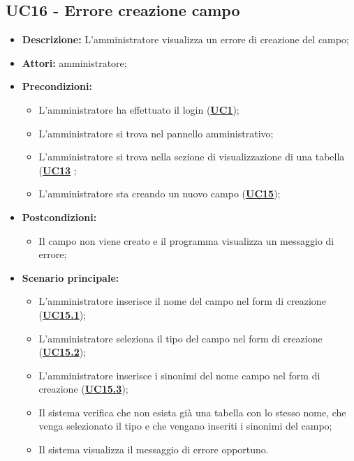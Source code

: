 \subsection{UC16 - Errore creazione campo}
\label{sec:UC16}
\begin{itemize}
	\item \textbf{Descrizione:} L’amministratore visualizza un errore di creazione del campo;
	\item \textbf{Attori:} amministratore;
	\item \textbf{Precondizioni:} 
	\begin{itemize}
		\item L’amministratore ha effettuato il login (\hyperref[sec:UC1]{\textbf{UC1}});
		\item L’amministratore si trova nel pannello amministrativo;
		\item L’amministratore si trova nella sezione di visualizzazione di una tabella (\hyperref[sec:UC13]{\textbf{UC13}} ;
		\item L’amministratore sta creando un nuovo campo (\hyperref[sec:UC15]{\textbf{UC15}});
	\end{itemize}
	\item \textbf{Postcondizioni:} 
	\begin{itemize}
		\item Il campo non viene creato e il programma visualizza un messaggio di errore;
	\end{itemize}
	\item \textbf{Scenario principale:} 
	\begin{itemize}
		\item L’amministratore inserisce il nome del campo nel form di creazione (\hyperref[sec:UC15.1]{\textbf{UC15.1}});
		\item L’amministratore seleziona il tipo del campo nel form di creazione (\hyperref[sec:UC15.2]{\textbf{UC15.2}});
		\item L’amministratore inserisce i sinonimi del nome campo nel form di creazione (\hyperref[sec:UC15.3]{\textbf{UC15.3}});
		\item Il sistema verifica che non esista già una tabella con lo stesso nome, che venga selezionato il tipo e che vengano inseriti i sinonimi del campo;
		\item Il sistema visualizza il messaggio di errore opportuno.
	\end{itemize}
\end{itemize}

